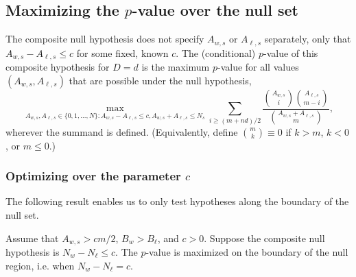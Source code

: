 \subsection{Maximizing the $p$-value over the null set}

The composite null hypothesis does not specify $A_{w,s}$ or $A_{\ell,s}$ separately, only 
that $A_{w,s} - A_{\ell,s} \le c$ for
some fixed, known $c$.
The (conditional) $p$-value of this composite hypothesis for $D=d$ is the maximum $p$-value for all
values $(A_{w,s}, A_{\ell,s})$ that are possible under the null hypothesis,
\begin{equation}
  \max_{A_{w,s}, A_{\ell,s} \in \{0, 1, \ldots, N \}: A_{w,s} - A_{\ell,s} \le c, A_{w,s} + A_{\ell,s} \le N_s}
   \sum_{i \geq (m+nd)/2} \frac{ {A_{w,s} \choose i}{A_{\ell,s} \choose m-i} }{{A_{w,s} + A_{\ell, s} \choose m}},
\end{equation}
wherever the summand is defined. 
(Equivalently, define ${m \choose k} \equiv 0$ if $k > m$, $k < 0$, or $m \le 0$.)

\subsubsection{Optimizing over the parameter $c$}
The following result enables us to only test hypotheses along the boundary of the null set.

\begin{thm}
Assume that $A_{w,s} > cm/2$, $B_w > B_\ell$, and $c>0$.
Suppose the composite null hypothesis is $N_w - N_\ell \leq c$.
The $p$-value is maximized on the boundary of the null region, i.e. when $N_w - N_\ell = c$.
\end{thm}


